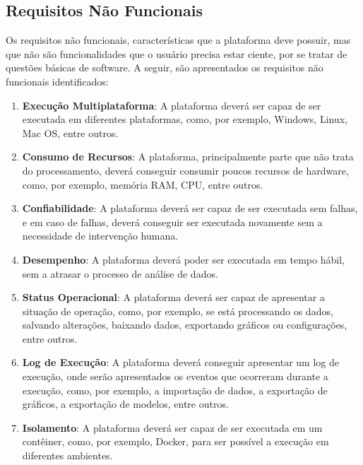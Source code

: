     \subsection{Requisitos Não Funcionais}

    Os requisitos não funcionais, características que a plataforma deve possuir, mas que não são funcionalidades que o usuário precisa estar ciente, por se tratar de questões básicas de software. A seguir, são apresentados os requisitos não funcionais identificados:

    \begin{enumerate}
        \item \textbf{Execução Multiplataforma}: A plataforma deverá ser capaz de ser executada em diferentes plataformas, como, por exemplo, Windows, Linux, Mac OS, entre outros.
        \item \textbf{Consumo de Recursos}: A plataforma, principalmente parte que não trata do processamento, deverá conseguir consumir poucos recursos de hardware, como, por exemplo, memória RAM, CPU, entre outros.
        \item \textbf{Confiabilidade}: A plataforma deverá ser capaz de ser executada sem falhas, e em caso de falhas, deverá conseguir ser executada novamente sem a necessidade de intervenção humana.
        \item \textbf{Desempenho}: A plataforma deverá poder ser executada em tempo hábil, sem a atrasar o processo de análise de dados.
        \item \textbf{Status Operacional}: A plataforma deverá ser capaz de apresentar a situação de operação, como, por exemplo, se está processando os dados, salvando alterações, baixando dados, exportando gráficos ou configurações, entre outros.
        \item \textbf{Log de Execução}: A plataforma deverá conseguir apresentar um log de execução, onde serão apresentados os eventos que ocorreram durante a execução, como, por exemplo, a importação de dados, a exportação de gráficos, a exportação de modelos, entre outros.
        \item \textbf{Isolamento}: A plataforma deverá ser capaz de ser executada em um contêiner, como, por exemplo, Docker, para ser possível a execução em diferentes ambientes.
    \end{enumerate}

    

    \setlength{\leftskip}{3cm}

